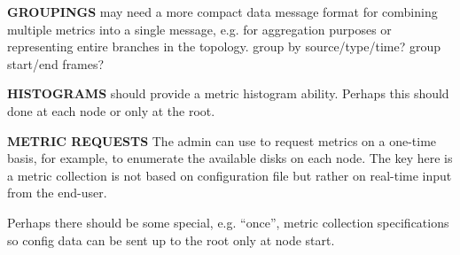 \textbf{GROUPINGS}
\dcamp may need a more compact data message format for combining multiple metrics into a single message, e.g. for
aggregation purposes or representing entire branches in the topology.
group by source/type/time?
group start/end frames?

\textbf{HISTOGRAMS}
\dcamp should provide a metric histogram ability. Perhaps this should done at each node or only at the root.

\textbf{METRIC REQUESTS}
The admin can use \dcamp to request metrics on a one-time basis, for example, to enumerate the available disks on each
node. The key here is a metric collection is not based on configuration file but rather on real-time input from the
end-user.

Perhaps there should be some special, e.g. ``once'', metric collection specifications so config data can be sent up to the
root only at node start.

